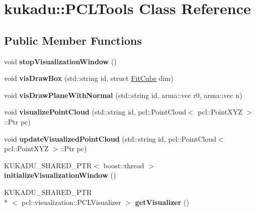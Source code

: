 \hypertarget{classkukadu_1_1PCLTools}{\section{kukadu\-:\-:P\-C\-L\-Tools Class Reference}
\label{classkukadu_1_1PCLTools}
}
\subsection*{Public Member Functions}
\begin{DoxyCompactItemize}
\item 
\hypertarget{classkukadu_1_1PCLTools_a14141dd30ae2c613b6547398bfe7b3d1}{void {\bfseries stop\-Visualization\-Window} ()}\label{classkukadu_1_1PCLTools_a14141dd30ae2c613b6547398bfe7b3d1}

\item 
\hypertarget{classkukadu_1_1PCLTools_a77ceff148e148532dfd6edef82aeba70}{void {\bfseries vis\-Draw\-Box} (std\-::string id, struct \hyperlink{structkukadu_1_1FitCube}{Fit\-Cube} dim)}\label{classkukadu_1_1PCLTools_a77ceff148e148532dfd6edef82aeba70}

\item 
\hypertarget{classkukadu_1_1PCLTools_a561208fa3e7334fb3541d39c18c2008c}{void {\bfseries vis\-Draw\-Plane\-With\-Normal} (std\-::string id, arma\-::vec r0, arma\-::vec n)}\label{classkukadu_1_1PCLTools_a561208fa3e7334fb3541d39c18c2008c}

\item 
\hypertarget{classkukadu_1_1PCLTools_a4964f97b079a8ec36b540bfb83d52853}{void {\bfseries visualize\-Point\-Cloud} (std\-::string id, pcl\-::\-Point\-Cloud$<$ pcl\-::\-Point\-X\-Y\-Z $>$\-::Ptr pc)}\label{classkukadu_1_1PCLTools_a4964f97b079a8ec36b540bfb83d52853}

\item 
\hypertarget{classkukadu_1_1PCLTools_a1c66a201e0907c90081d8b8940277563}{void {\bfseries update\-Visualized\-Point\-Cloud} (std\-::string id, pcl\-::\-Point\-Cloud$<$ pcl\-::\-Point\-X\-Y\-Z $>$\-::Ptr pc)}\label{classkukadu_1_1PCLTools_a1c66a201e0907c90081d8b8940277563}

\item 
\hypertarget{classkukadu_1_1PCLTools_a97b51443aea50669a88b3a0c4fd6b769}{K\-U\-K\-A\-D\-U\-\_\-\-S\-H\-A\-R\-E\-D\-\_\-\-P\-T\-R$<$ boost\-::thread $>$ {\bfseries initialize\-Visualization\-Window} ()}\label{classkukadu_1_1PCLTools_a97b51443aea50669a88b3a0c4fd6b769}

\item 
\hypertarget{classkukadu_1_1PCLTools_a99abc0b66655b8511f519c2f42c740be}{K\-U\-K\-A\-D\-U\-\_\-\-S\-H\-A\-R\-E\-D\-\_\-\-P\-T\-R\\*
$<$ pcl\-::visualization\-::\-P\-C\-L\-Visualizer $>$ {\bfseries get\-Visualizer} ()}\label{classkukadu_1_1PCLTools_a99abc0b66655b8511f519c2f42c740be}

\end{DoxyCompactItemize}
